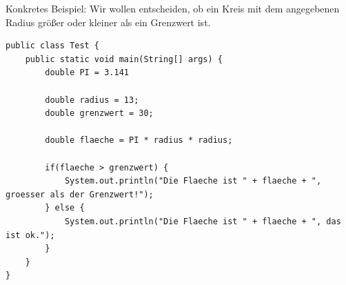 \documentclass[ngerman,11pt]{article}
\begin{document}
    Konkretes Beispiel: Wir wollen entscheiden, ob ein Kreis mit dem angegebenen Radius größer oder kleiner als ein Grenzwert ist.

    \begin{lstlisting}[caption=Kreisfläche]
public class Test {
    public static void main(String[] args) {
        double PI = 3.141

        double radius = 13;
        double grenzwert = 30;

        double flaeche = PI * radius * radius;

        if(flaeche > grenzwert) {
            System.out.println("Die Flaeche ist " + flaeche + ", groesser als der Grenzwert!");
        } else {
            System.out.println("Die Flaeche ist " + flaeche + ", das ist ok.");
        }
    }
}
    \end{lstlisting}
\end{document}
